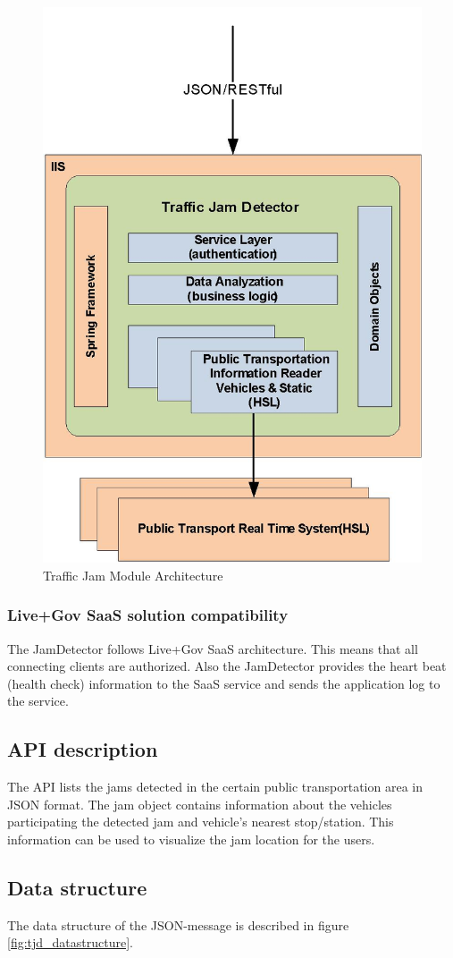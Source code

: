 \begin{figure}
\centering
\includegraphics[width=0.5 \textwidth]{img/tjd/architecture.jpg}
\caption{Traffic Jam Module Architecture}\label{fig:tjd_architecture}
\end{figure}

\subsubsection*{Live+Gov SaaS solution compatibility}

The JamDetector follows Live+Gov SaaS architecture. This means that
all connecting clients are authorized. Also the JamDetector provides
the heart beat (health check) information to the SaaS service and
sends the application log to the service.  

\subsection*{API description}

The API lists the jams detected in the certain public transportation
area in JSON format. The jam object contains information about the
vehicles participating the detected jam and vehicle’s nearest
stop/station. This information can be used to visualize the jam
location for the users.

\subsection*{Data structure}

The data structure of the JSON-message is described in figure \ref{fig:tjd_datastructure}.

